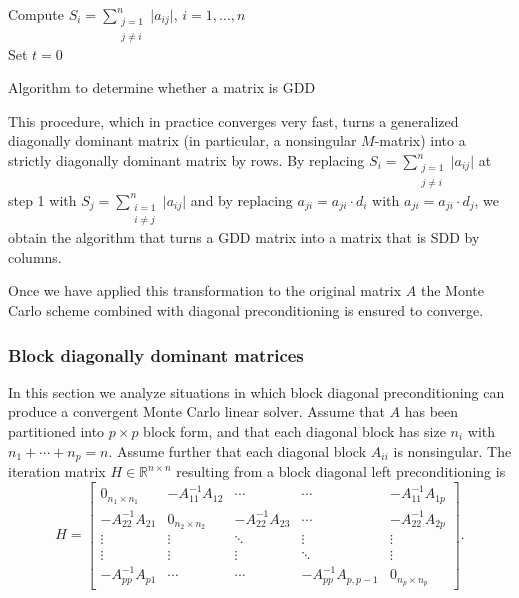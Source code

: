 \documentclass[final,leqno,onefignum,onetabnum]{siamltex1213}
\begin{document}
\begin{algorithm}[H]
\LinesNumbered
 
 Compute $\displaystyle S_{i}=\sum_{\substack{j=1 \\ j\ne i}}^n\lvert
a_{ij}\rvert$,
$i=1,\ldots,n$\\
Set $t=0$\\ 
 \caption{Algorithm to determine whether a matrix is GDD}
\end{algorithm}

This procedure, which in practice converges very fast, turns a generalized 
diagonally dominant matrix (in particular, a nonsingular $M$-matrix) into a
strictly diagonally dominant matrix by rows. By replacing
$\displaystyle S_{i}=\sum^{n}_{\substack{j=1 \\ j\ne i}}\lvert a_{ij}\rvert$
at step 1 with
$\displaystyle S_{j}=\sum^{n}_{\substack{i=1 \\ i\ne j}}\lvert a_{ij}\rvert$
and by replacing
$a_{ji}=a_{ji}\cdot d_i$ with $a_{ji}=a_{ji}\cdot d_j$, we obtain the algorithm
that turns a GDD matrix into a matrix that is SDD by columns.

Once we have applied this transformation to the original matrix $A$
the Monte Carlo scheme combined with diagonal preconditioning
is ensured to converge.

\subsubsection{Block diagonally dominant matrices}
\label{sec:bdd}

In this section we analyze situations in which block diagonal preconditioning
can produce a convergent Monte Carlo linear solver.
Assume that $A$ has been partitioned into $p\times p$ block form, and that 
each diagonal block has size $n_i$ with $n_1 +\cdots +n_p=n$. Assume further
that each diagonal block $A_{ii}$ is nonsingular.
The iteration
matrix $H\in\mathbb{R}^{n\times n}$ resulting from a block diagonal left
preconditioning is
\[
 H=\begin{bmatrix}0_{n_1\times n_1} & -A_{11}^{-1}A_{12} & \cdots &
\cdots & -A_{11}^{-1}A_{1p} \\
-A_{22}^{-1}A_{21} & 0_{n_2\times n_2} & -A_{22}^{-1}A_{23} &
\cdots & -A_{22}^{-1}A_{2p}\\
\vdots & \vdots & \ddots & \vdots & \vdots\\
\vdots & \vdots & \vdots &\ddots & \vdots \\
-A_{pp}^{-1}A_{p1} &  \cdots & \cdots&
-A_{pp}^{-1}A_{p,p-1} & 0_{n_p \times n_p}
\end{bmatrix}.
\]
\end{document}
